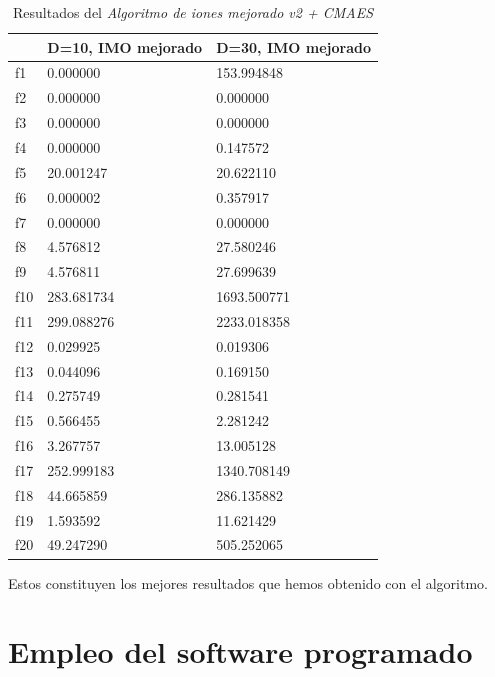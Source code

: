 \documentclass[a4paper,11pt]{article}
\begin{document}
\begin{itemize}
  \begin{table}[H]	
  \caption{Resultados del \textit{Algoritmo de iones mejorado v2 + CMAES}}
  \centering
  \begin{tabular}{|l|l|l|}
  \hline
  & \textbf{D=10, IMO mejorado} & \textbf{D=30, IMO mejorado} \\ \hline
  f1 &  0.000000 &  153.994848 \\ \hline
  f2 &  0.000000 &  0.000000 \\ \hline
  f3 &  0.000000 &  0.000000 \\ \hline
  f4 &  0.000000 &  0.147572 \\ \hline
  f5 &  20.001247 &  20.622110 \\ \hline
  f6 &  0.000002 &  0.357917 \\ \hline
  f7 &  0.000000 &  0.000000 \\ \hline
  f8 &  4.576812 &  27.580246 \\ \hline
  f9 &  4.576811 &  27.699639 \\ \hline
  f10 &  283.681734 &  1693.500771 \\ \hline
  f11 &  299.088276 &  2233.018358 \\ \hline
  f12 &  0.029925 &  0.019306 \\ \hline
  f13 &  0.044096 &  0.169150 \\ \hline
  f14 &  0.275749 &  0.281541 \\ \hline
  f15 &  0.566455 &  2.281242 \\ \hline
  f16 &  3.267757 &  13.005128 \\ \hline
  f17 &  252.999183 &  1340.708149 \\ \hline
  f18 &  44.665859 &  286.135882 \\ \hline
  f19 &  1.593592 &  11.621429 \\ \hline
  f20 &  49.247290 &  505.252065 \\ \hline
  \end{tabular}
  \end{table}
  
  Estos constituyen los mejores resultados que hemos obtenido con el algoritmo.
  
\end{itemize}



\section{Empleo del software programado}
\end{document}
